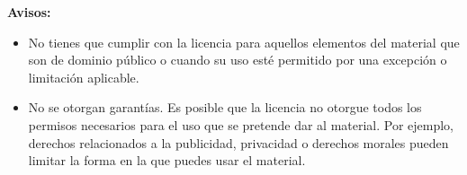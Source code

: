 {\vspace{\baselineskip}

\textbf{Avisos:}

\begin{itemize}

\item
  No tienes que cumplir con la licencia para aquellos elementos del
  material que son de dominio público o cuando su uso esté permitido
  por una excepción o limitación aplicable. 

\item
  No se otorgan garantías. Es posible que la licencia no otorgue
  todos los permisos necesarios para el uso que se pretende dar al material. 
  Por ejemplo, derechos relacionados a la publicidad, privacidad o derechos morales 
  pueden limitar la forma en la que puedes usar el material.

\end{itemize}
}
